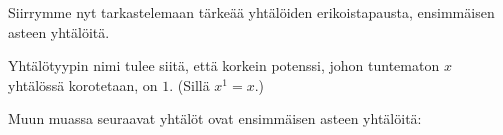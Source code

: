 Siirrymme nyt tarkastelemaan tärkeää yhtälöiden erikoistapausta, ensimmäisen asteen yhtälöitä.


Yhtälötyypin nimi tulee siitä, että korkein potenssi, johon tuntematon $x$
yhtälössä korotetaan, on $1$. (Sillä $x^{1}=x$.)

\begin{esimerkki}
Muun muassa seuraavat yhtälöt ovat ensimmäisen asteen yhtälöitä:
\begin{alakohdat}
\end{alakohdat}
\end{esimerkki}

%		

